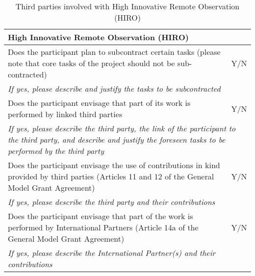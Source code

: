 \begin{table}[H]
	\centering
	\begin{tabular}{|p{10cm}|p{4cm}|}
		\hline
		
		\multicolumn{2}{|p{14cm}|}{\textbf{High Innovative Remote Observation (HIRO)}}\\
		
		\hline
		
		Does the participant plan to subcontract certain tasks (please note that core tasks of the project should not be sub-contracted) & Y/N\\
		
		\hline
		
		\multicolumn{2}{|p{14cm}|}{\textit{If yes, please describe and justify the tasks to be subcontracted}}\\
		
		\hline
		
		Does the participant envisage that part of its work is performed by linked third parties & Y/N\\
		
		\hline
		
		\multicolumn{2}{|p{14cm}|}{\textit{If yes, please describe the third party, the link of the participant to the third party, and describe and justify the foreseen tasks to be performed by the third party}}\\
		
		\hline
		
		Does the participant envisage the use of contributions in kind provided by third parties (Articles 11 and 12 of the General Model Grant Agreement) & Y/N\\
		
		\hline
		
		\multicolumn{2}{|p{14cm}|}{\textit{If yes, please describe the third party and their contributions}}\\
		
		\hline
		
		Does the participant envisage that part of the work is performed by International Partners (Article 14a of the General Model Grant Agreement) & Y/N\\
		
		\hline
		
		\multicolumn{2}{|p{14cm}|}{\textit{If yes, please describe the International Partner(s) and their contributions}}\\
		
		\hline
	\end{tabular}
	\caption{Third parties involved with High Innovative Remote Observation (HIRO)}
\end{table}



